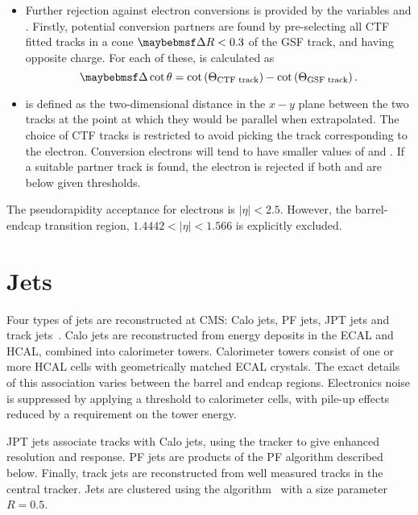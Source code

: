 \begin{itemize}
\item Further rejection against electron conversions is provided by the
  variables \Distnm and \DeltaCotThetanm. Firstly, potential conversion partners
  are found by pre-selecting all \ac{CTF} fitted tracks in a cone $\DeltaR <
  0.3$ of the \ac{GSF} track, and having opposite charge. For each of these,
  \DeltaCotThetanm is calculated as
\begin{equation*}
  \DeltaCotThetanm = \cot\left(\Theta_{\textrm{CTF track}}\right) - \cot\left(\Theta_{\textrm{GSF track}}\right).
\end{equation*}
\item \Distnm is defined as the two-dimensional distance in the $x-y$ plane between the
two tracks at the point at which they would be parallel when extrapolated. The
choice of \ac{CTF} tracks is restricted to avoid picking the track corresponding
to the electron. Conversion electrons will tend to have smaller values of
\DeltaCotTheta and \Dist. If a suitable partner track is found, the electron is
rejected if both \Dist and \DeltaCotTheta are below given thresholds.
\end{itemize}

The pseudorapidity acceptance for electrons is $|\eta| < 2.5$. However, the
barrel-endcap transition region, $1.4442 < |\eta| < 1.566$ is explicitly excluded.



\section{Jets}
\label{sec:reco_jets}
Four types of jets are reconstructed at \ac{CMS}: \acf{Calo} jets, \ac{PF} jets,
\ac{JPT} jets and track jets~\cite{jet_perf_pas}. \ac{Calo} jets are
reconstructed from energy deposits in the \ac{ECAL} and \ac{HCAL}, combined into
calorimeter towers. Calorimeter towers consist of one or more \ac{HCAL} cells
with geometrically matched \ac{ECAL} crystals. The exact details of this
association varies between the barrel and endcap regions. Electronics noise is
suppressed by applying a threshold to calorimeter cells, with pile-up effects
reduced by a requirement on the tower energy.

\ac{JPT} jets associate tracks with \ac{Calo} jets, using the tracker to give
enhanced \Pt resolution and response. \ac{PF} jets are products of the \acl{PF}
algorithm described below. Finally, track jets are reconstructed from well
measured tracks in the central tracker. Jets are clustered using the \antiKT
algorithm~\cite{antiKT} with a size parameter $R=0.5$.

